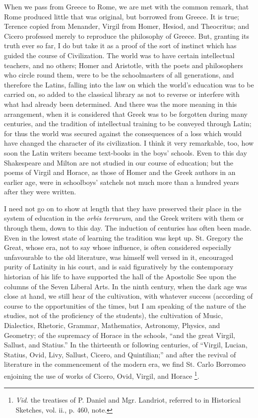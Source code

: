 When we pass from Greece to Rome, we are met with the common
remark, that Rome produced little that was original, but borrowed from
Greece. It is true; Terence copied from Menander, Virgil from Homer,
Hesiod, and Theocritus; and Cicero professed merely to reproduce
the philosophy of Greece. But, granting its truth ever so far, I do
but take it as a proof of the sort of instinct which has guided the
course of Civilization. The world was to have certain intellectual
teachers, and no others; Homer and Aristotle, with the poets and
philosophers who circle round them, were to be the schoolmasters of
all generations, and therefore the Latins, falling into the law on
which the world's education was to be carried on, so added to the
classical library as not to reverse or interfere with what had already
been determined. And there was the more meaning in this arrangement,
when it is considered that Greek was to be forgotten during many
centuries, and the tradition of intellectual training to be conveyed
through Latin; for thus the world was secured against the consequences
of a loss which would have changed the character of its civilization.
I think it very remarkable, too, how soon the Latin writers became
text-books in the boys' schools. Even to this day Shakespeare and
Milton are not studied in our course of education; but the poems of
Virgil and Horace, as those of Homer and the Greek authors in an
earlier age, were in schoolboys' satchels not much more than a hundred
years after they were written.

I need not go on to show at length that they have preserved their
place in the system of education in the \emph{orbis terrarum}, and the
Greek writers with them or through them, down to this day. The
induction of centuries has often been made. Even in the lowest state
of learning the tradition was kept up. St. Gregory the Great, whose
era, not to say whose influence, is often considered especially
unfavourable to the old literature, was himself well versed in it,
encouraged purity of Latinity in his court, and is said figuratively
by the contemporary historian of his life to have supported the
hall of the Apostolic See upon the columns of the Seven Liberal Arts.
In the ninth century, when the dark age was close at hand, we still
hear of the cultivation, with whatever success (according of course to
the opportunities of the times, but I am speaking of the nature of the
studies, not of the proficiency of the students), the cultivation of
Music, Dialectics, Rhetoric, Grammar, Mathematics, Astronomy, Physics,
and Geometry; of the supremacy of Horace in the schools, ``and the
great Virgil, Sallust, and Statius.'' In the thirteenth or
following centuries, of ``Virgil, Lucian, Statius, Ovid, Livy,
Sallust, Cicero, and Quintilian;'' and after the revival of
literature in the commencement of the modern era, we find St. Carlo
Borromeo enjoining the use of works of Cicero, Ovid, Virgil, and
Horace \footnote{\emph{Vid}. the
treatises of P. Daniel and Mgr. Landriot, referred to in Historical
Sketches, vol. ii., p. 460, note.}.

